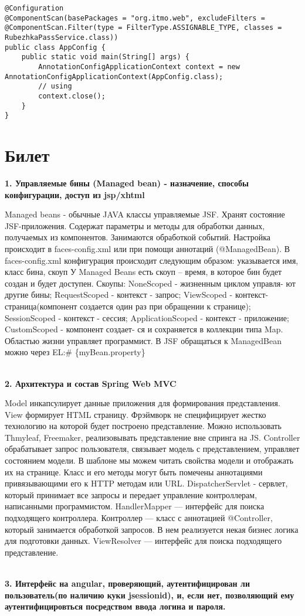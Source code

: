 \documentclass{article}
\newcommand{\bil}[5]{%
        \section{Билет}
        \textbf{1. #1}

        #4
        \\
        \textbf{2. #2}
        
        #5
        \\
        \textbf{3. #3}
}
\begin{document}
\begin{lstlisting}[frame=single, basicstyle=\ttfamily, breaklines=true, breakatwhitespace=true, postbreak=\mbox{\textcolor{red}{$\hookrightarrow$}\space}]
@Configuration
@ComponentScan(basePackages = "org.itmo.web", excludeFilters = @ComponentScan.Filter(type = FilterType.ASSIGNABLE_TYPE, classes = RubezhkaPassService.class))
public class AppConfig {
    public static void main(String[] args) {
        AnnotationConfigApplicationContext context = new AnnotationConfigApplicationContext(AppConfig.class);
        // using
        context.close();
    }
}
\end{lstlisting}

\bil{Управляемые бины (Managed bean) - назначение, способы конфигурации, доступ из jsp/xhtml}{Архитектура и состав Spring Web MVC}{Интерфейс на angular, проверяющий, аутентифицирован ли пользователь(по наличию куки jsessionid), и, если нет, позволяющий ему аутентифицировться посредством ввода логина и пароля.}{
    Managed beans - обычные JAVA классы управляемые JSF. Хранят состояние JSF-приложения. 
    Содержат параметры и методы для обработки данных, получаемых из компонентов. 
    Занимаются обработкой событий. Настройка происходит в faces-config.xml или при помощи аннотаций (@ManagedBean). 
    В faces-config.xml конфигурация происходит следующим образом: указывается имя, класс бина, скоуп
    У Managed Beans есть скоуп – время, в которое бин будет создан и будет доступен. 
    Скоупы: NoneScoped - жизненным циклом управля- ют другие бины; RequestScoped - контекст - запрос; 
    ViewScoped - контекст-страница(компонент создается один раз при обращении к странице); 
    SessionScoped - контекст - сессия; ApplicationScoped - контекст - приложение; 
    CustomScoped - компонент создает- ся и сохраняется в коллекции типа Map.
    Областью жизни управляет программист. В JSF обращаться к ManagedBean можно через EL:\# \{myBean.property\}
}{
    Model инкапсулирует данные приложения для формирования представления. 
    View формирует HTML страницу. 
    Фрэймворк не специфицирует жестко технологию на которой будет построено представление. 
    Можно использовать Thmyleaf, Freemaker, реализовывать представление вне спринга на JS. 
    Controller обрабатывает запрос пользователя, связывает модель с представлением, управляет состоянием модели. 
    В шаблоне мы можем читать свойства модели и отображать их на странице. 
    Класс и его методы могут быть помечены аннотациями привязывающими его к HTTP методам или URL. 
    DispatcherServlet - сервлет, который принимает все запросы и передает управление контроллерам, написанными программистом. 
    HandlerMapper — интерфейс для поиска подходящего контроллера. Контроллер — класс с аннотацией @Controller, который занимается обработкой запросов. 
    В нем реализуется некая бизнес логика для подготовки данных. ViewResolver — интерфейс для поиска подходящего представление.
}
\end{document}
